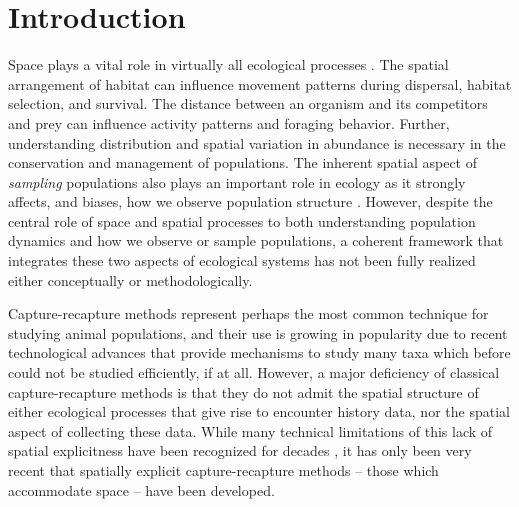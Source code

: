 \chapter{
Introduction
}
\label{chapt.intro}

\vspace{.3in}

Space plays a vital role in virtually all ecological
processes \citep{tilman_kareiva:1997,hanski:1999,
  clobert_etal:2001}. The spatial arrangement of habitat can influence
movement patterns during dispersal, habitat selection, and survival.
The distance between an organism and its competitors and
prey can influence activity patterns and foraging
behavior. 
Further, 
understanding distribution and spatial variation in abundance 
is necessary in the conservation and management of populations.
The inherent spatial aspect of {\it sampling} populations also plays
an important role in ecology as it strongly affects, and biases, how
we observe population structure
\citep{seber:1982,buckland_etal:2001,borchers_etal:2002,williams_etal:2002}.
However, despite the central role of space and spatial processes to
both understanding population dynamics and how we observe or sample
populations, a coherent framework that integrates these two aspects of
ecological systems has not been fully realized either conceptually or
methodologically.



Capture-recapture methods represent perhaps the most common technique
for studying animal populations, and their use is growing in
popularity due to recent technological advances that provide mechanisms
to study many taxa which before could not be studied efficiently, if
at all.  However, a major deficiency of classical capture-recapture
methods is that they do not admit the spatial structure of either
ecological processes that give rise to encounter history data, nor the
spatial aspect of collecting these data. While many technical
limitations of this lack of spatial explicitness have been recognized
for decades \citep{dice:1938, hayne:1950}, it has only been very 
recent \citep{efford:2004,borchers:2011} that spatially explicit
capture-recapture methods -- those which accommodate space -- have been
developed.

